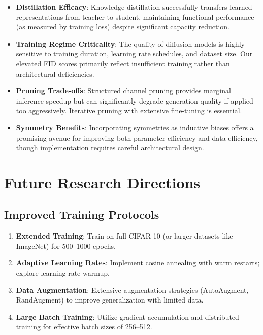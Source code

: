 \documentclass[12pt]{report}
\theoremstyle{definition}
\begin{document}
\begin{itemize}
\item \textbf{Distillation Efficacy}: Knowledge distillation successfully transfers learned representations from teacher to student, maintaining functional performance (as measured by training loss) despite significant capacity reduction.

\item \textbf{Training Regime Criticality}: The quality of diffusion models is highly sensitive to training duration, learning rate schedules, and dataset size. Our elevated FID scores primarily reflect insufficient training rather than architectural deficiencies.

\item \textbf{Pruning Trade-offs}: Structured channel pruning provides marginal inference speedup but can significantly degrade generation quality if applied too aggressively. Iterative pruning with extensive fine-tuning is essential.

\item \textbf{Symmetry Benefits}: Incorporating symmetries as inductive biases offers a promising avenue for improving both parameter efficiency and data efficiency, though implementation requires careful architectural design.
\end{itemize}

\section{Future Research Directions}

\subsection{Improved Training Protocols}

\begin{enumerate}
\item \textbf{Extended Training}: Train on full CIFAR-10 (or larger datasets like ImageNet) for 500--1000 epochs.
\item \textbf{Adaptive Learning Rates}: Implement cosine annealing with warm restarts; explore learning rate warmup.
\item \textbf{Data Augmentation}: Extensive augmentation strategies (AutoAugment, RandAugment) to improve generalization with limited data.
\item \textbf{Large Batch Training}: Utilize gradient accumulation and distributed training for effective batch sizes of 256--512.
\end{enumerate}
\end{document}
